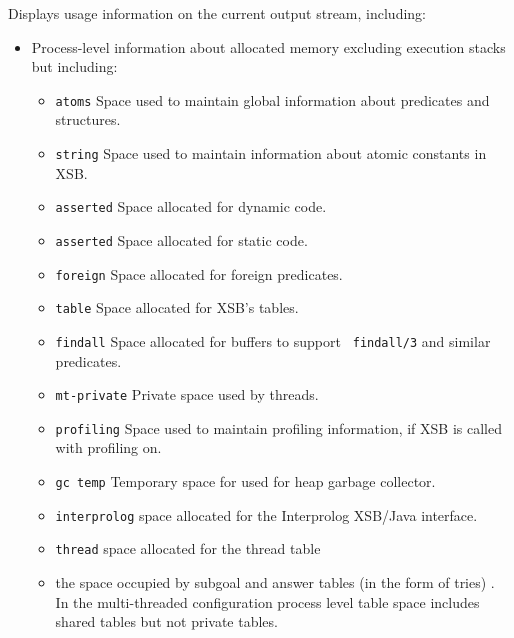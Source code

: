 \begin{description}

%
Displays usage information on the current output stream, including: 
\begin{itemize} 
\item Process-level information about allocated memory excluding
  execution stacks but including: 
\begin{itemize}
\item {\tt atoms} Space used to maintain global information about
  predicates and structures. 
%
\item {\tt string} Space used to maintain information about atomic
  constants in XSB.
%
\item {\tt asserted} Space allocated for dynamic code.
%
\item {\tt asserted} Space allocated for static code.
%
\item {\tt foreign} Space allocated for foreign predicates.
%
\item {\tt table} Space allocated for XSB's tables.
%
\item {\tt findall} Space allocated for buffers to support {\tt
  findall/3} and similar predicates.
%
\item {\tt mt-private} Private space used by threads.
%
\item {\tt profiling} Space used to maintain profiling information, if
  XSB is called with profiling on.
%
\item {\tt gc temp} Temporary space for used for heap garbage
  collector.
%
\item {\tt interprolog} space allocated for the Interprolog XSB/Java
  interface.
%
\item {\tt thread} space allocated for the thread table
%
\item the space occupied by subgoal and answer tables (in the form of
  tries) \cite{RRSSW98,CuSW99b,TST99}.  In the multi-threaded
  configuration process level table space includes shared tables but
  not private tables.
\end{itemize}


\end{itemize}
\end{description}
